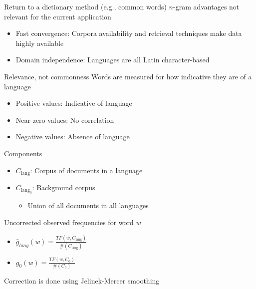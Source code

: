 \documentclass{beamer}
\begin{document}
      \begin{frame}{\subseven}
        \begin{block}{Return to a dictionary method (e.g., common words)}
          $n$-gram advantages not relevant for the current application
          \begin{itemize}
            \item Fast convergence: Corpora availability and retrieval techniques make data highly available
            \item Domain independence: Languages are all Latin character-based
          \end{itemize}
        \end{block}
      \end{frame}

      \begin{frame}{\subseven}
        \begin{block}{Relevance, not commonness}
          Words are measured for how indicative they are of a language
          \begin{itemize}
            \item Positive values: Indicative of language
            \item Near-zero values: No correlation
            \item Negative values: Absence of language
          \end{itemize}
        \end{block}
      \end{frame}

      \begin{frame}{\subseven}
        \begin{block}{Components}
          \begin{itemize}
            \item $C_{\text{lang}}$: Corpus of documents in a language
            \item $C_{\text{lang}_0}$: Background corpus
            \begin{itemize}
              \item Union of all documents in all languages
            \end{itemize}
          \end{itemize}
        \end{block}
        \begin{block}{Uncorrected observed frequencies for word $w$}
          {\small
            \begin{itemize}
              \item $\bar{g}_{lang}(w) = \frac{TF(w, C_{\text{lang}})}
                                              {\#(C_{\text{lang}})}$
              \item $g_{0}(w) = \frac{TF(w, C_{0})}
                                     {\#(C_{0})}$
            \end{itemize}
          }
          Correction is done using Jelinek-Mercer smoothing
        \end{block}
      \end{frame}
\end{document}
